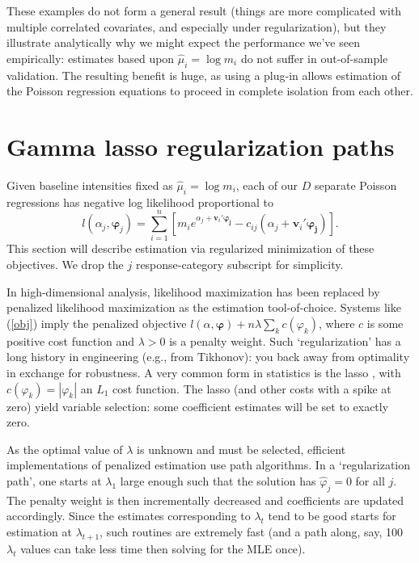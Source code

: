 \documentclass[12pt]{article}
\newcommand{\bs}[1]{\boldsymbol{#1}}
\newcommand{\bm}[1]{\mathbf{#1}}
\begin{document}
These examples do not form a general result (things are more complicated with multiple correlated covariates, and especially under regularization), but they illustrate analytically
why we might expect the performance we've seen empirically: estimates based upon $\hat \mu_i = \log m_i$ do not
suffer in out-of-sample validation. The resulting benefit is huge, as using a
plug-in allows estimation of the Poisson regression equations to proceed in
complete isolation from each other.

\section{Gamma lasso regularization paths}
\label{GL}

Given baseline intensities fixed as $\hat \mu_i = \log m_i$, each of our $D$ separate Poisson
regressions has negative log likelihood proportional to
\begin{equation}\label{obj}
l(\alpha_j, \bs{\varphi}_j) = \sum_{i=1}^n \left[ m_i 
e^{\alpha_j + \bm{v}_i'\bs{\varphi_j}} - c_{ij}(\alpha_j + \bm{v}_i'\bs{\varphi_j})\right].
\end{equation}
This section will describe estimation via regularized minimization of
these objectives. We drop the $j$ response-category subscript for
simplicity.

In high-dimensional analysis, likelihood maximization has been replaced by
penalized likelihood maximization as the estimation tool-of-choice.  Systems
like (\ref{obj}) imply the penalized objective $l(\alpha,\bs{\varphi}) +
n\lambda \sum_k c(\varphi_k)$, where $c$ is some positive cost function and
$\lambda >0$ is a penalty weight.  Such `regularization' has a long history in
engineering (e.g., from Tikhonov): you back away from optimality in exchange
for robustness.  A very common form in statistics is the lasso
\citep{tibshirani_regression_1996}, with $c(\varphi_k) = |\varphi_k|$ an $L_1$
cost function.  The lasso (and other costs with a spike at zero) yield
variable selection: some coefficient estimates will be set to exactly zero.

As the optimal value of $\lambda$ is unknown and must be selected, efficient
implementations of penalized estimation use path algorithms.  In a
`regularization path', one starts at $\lambda_1$ large enough such that the
solution has $\hat\varphi_j=0$ for all $j$.  The penalty weight is then
incrementally decreased and coefficients are updated accordingly. Since the
estimates corresponding to $\lambda_t$ tend to be good starts for estimation
at $\lambda_{t+1}$, such routines are extremely fast (and a path along, say,
100 $\lambda_t$ values can take less time then solving for the MLE once).
\end{document}
